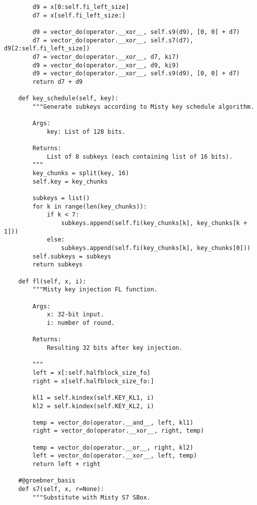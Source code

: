 \begin{lstlisting}
        d9 = x[0:self.fi_left_size]
        d7 = x[self.fi_left_size:]

        d9 = vector_do(operator.__xor__, self.s9(d9), [0, 0] + d7)
        d7 = vector_do(operator.__xor__, self.s7(d7), d9[2:self.fi_left_size])
        d7 = vector_do(operator.__xor__, d7, ki7)
        d9 = vector_do(operator.__xor__, d9, ki9)
        d9 = vector_do(operator.__xor__, self.s9(d9), [0, 0] + d7)
        return d7 + d9

    def key_schedule(self, key):
        """Generate subkeys according to Misty key schedule algorithm.

        Args:
            key: List of 128 bits.

        Returns:
            List of 8 subkeys (each containing list of 16 bits).
        """
        key_chunks = split(key, 16)
        self.key = key_chunks

        subkeys = list()
        for k in range(len(key_chunks)):
            if k < 7:
                subkeys.append(self.fi(key_chunks[k], key_chunks[k + 1]))
            else:
                subkeys.append(self.fi(key_chunks[k], key_chunks[0]))
        self.subkeys = subkeys
        return subkeys

    def fl(self, x, i):
        """Misty key injection FL function.

        Args:
            x: 32-bit input.
            i: number of round.

        Returns:
            Resulting 32 bits after key injection.

        """
        left = x[:self.halfblock_size_fo]
        right = x[self.halfblock_size_fo:]

        kl1 = self.kindex(self.KEY_KL1, i)
        kl2 = self.kindex(self.KEY_KL2, i)

        temp = vector_do(operator.__and__, left, kl1)
        right = vector_do(operator.__xor__, right, temp)

        temp = vector_do(operator.__or__, right, kl2)
        left = vector_do(operator.__xor__, left, temp)
        return left + right

    #@groebner_basis
    def s7(self, x, r=None):
        """Substitute with Misty S7 SBox.


\end{lstlisting}

